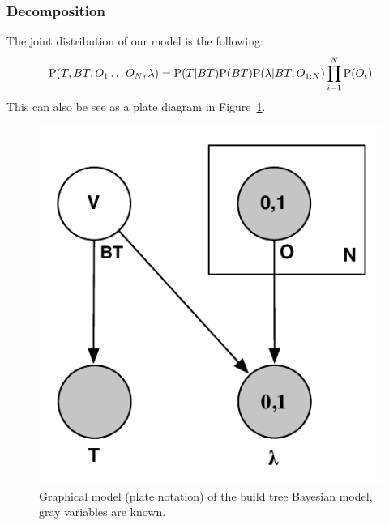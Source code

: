 \subsubsection{Decomposition}
The joint distribution of our model is the following:
\begin{equation}
\mathrm{P}(T, BT, O_1 \dots O_N, \lambda) = \mathrm{P}(T | BT)\mathrm{P}(BT) \mathrm{P}(\lambda | BT, O_{1:N})\prod_{i=1}^{N}\mathrm{P}(O_{i}) 
\end{equation}
This can also be see as a plate diagram in Figure~\ref{fig:buildtreeplate}.

\begin{figure}[h]
\begin{center}
\includegraphics[width=0.35\columnwidth]{images/BuildTreePrediction_plate.pdf}
\end{center}
\caption{Graphical model (plate notation) of the build tree Bayesian model, gray variables are known.}
\label{fig:buildtreeplate}
\end{figure}

